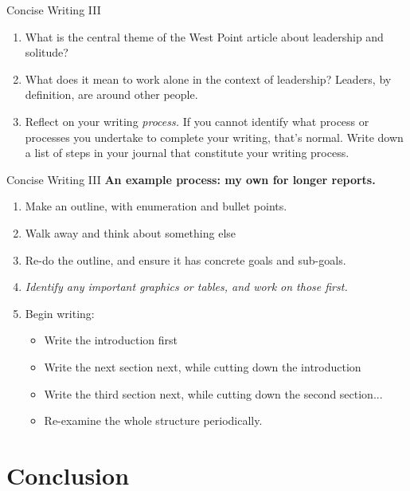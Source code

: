 \documentclass{beamer}
\begin{document}
\begin{frame}{Concise Writing III}
\begin{enumerate}
\item What is the central theme of the West Point article about leadership and solitude?
\item What does it mean to work alone in the context of leadership?  Leaders, by definition, are around other people.
\item Reflect on your writing \textit{process.}  If you cannot identify what process or processes you undertake to complete your writing, that's normal.  Write down a list of steps in your journal that constitute your writing process.
\end{enumerate}
\end{frame}

\begin{frame}{Concise Writing III}
\textbf{An example process: my own for longer reports.}
\begin{enumerate}
\item Make an outline, with enumeration and bullet points.
\item Walk away and think about something else
\item Re-do the outline, and ensure it has concrete goals and sub-goals.
\item \textit{Identify any important graphics or tables, and work on those first.}
\item Begin writing:
\begin{itemize}
\item Write the introduction first
\item Write the next section next, while cutting down the introduction
\item Write the third section next, while cutting down the second section...
\item Re-examine the whole structure periodically.
\end{itemize}
\end{enumerate}
\end{frame}

\section{Conclusion}
\end{document}

